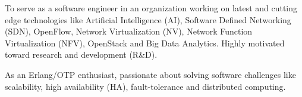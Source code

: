 

\begin{cvparagraph}

To serve as a software engineer in an organization working on latest and cutting edge
technologies like Artificial Intelligence (AI), Software Defined Networking (SDN), OpenFlow,
Network Virtualization (NV), Network Function Virtualization (NFV), OpenStack and
Big Data Analytics. Highly motivated toward research and development (R\&D).

As an Erlang/OTP enthusiast, passionate about solving software challenges like scalability,
high availability (HA), fault-tolerance and distributed computing.

\end{cvparagraph}
